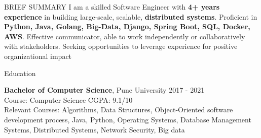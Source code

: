 \documentclass{resume} %
\begin{document}

\begin{rSection}{BRIEF SUMMARY}
\linespread{1.0}
{ I am a skilled Software Engineer with\textbf{ 4+ years experience} in building large-scale, scalable, \textbf{distributed systems}. Proficient in \textbf{Python, Java, Golang, Big-Data, Django, Spring Boot, SQL, Docker, AWS}. Effective communicator, able to work independently or collaboratively with stakeholders. Seeking opportunities to leverage experience for positive organizational impact }


\end{rSection}

\begin{rSection}{Education}

{\bf Bachelor  of Computer Science}, Pune University \hfill { 2017 - 2021}\\
Course: Computer Science \hfill CGPA: 9.1/10\\ 
Relevant Courses: Algorithms, Data Structures, Object-Oriented software development process, Java, Python, Operating  Systems, Database Management Systems, Distributed Systems, Network Security, Big data



\end{rSection}
\end{document}
